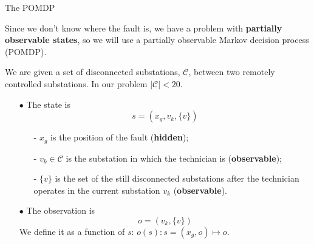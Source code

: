 \documentclass[10pt, aspectratio=169, compress, protectframetitle, handout]{beamer}
\begin{document}
\begin{frame}{The POMDP}

    Since we don't know where the fault is, we have a problem with \textbf{partially observable states}, so we will use a \alert{partially observable Markov decision process (POMDP)}.

    We are given a set of disconnected substations, $\mathcal C$, between two remotely controlled substations. In our problem $|\mathcal C| < 20$.

    \begin{itemize}
        \item[\alert{$\bullet$}] The \alert{state} is
        \begin{equation*}
            s = (x_g, v_k, \{v\})
        \end{equation*}
        \begin{itemize}
            \item[\alert{-}] $x_g$ is the position of the fault (\textbf{hidden});\\
            \item[\alert{-}] $v_k \in \mathcal C$ is the substation in which the technician is (\textbf{observable});\\
            \item[\alert{-}] $\{v\}$ is the set of the still disconnected substations after the technician operates in the current substation $v_k$ (\textbf{observable}).
        \end{itemize}
        \medskip
        
        \item[\alert{$\bullet$}] The \alert{observation} is
        \begin{equation*}
            o = (v_k, \{v\})
        \end{equation*}
        We define it as a function of $s$: $o(s): s = (x_g, o ) \mapsto o$.
    \end{itemize}
\end{frame}
\end{document}
